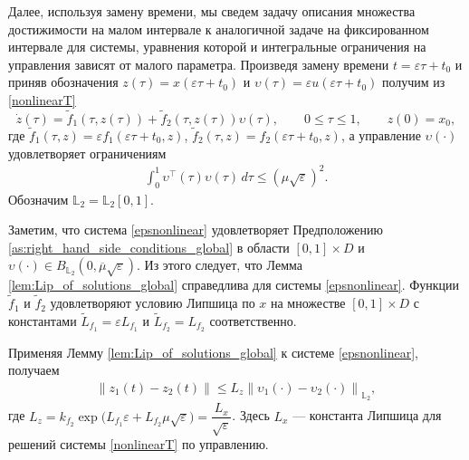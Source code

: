 \documentclass[../main.tex]{subfiles}
\begin{document}
	Далее, используя замену времени, мы сведем задачу описания множества достижимости на малом интервале к аналогичной задаче на фиксированном интервале для системы, уравнения которой и интегральные ограничения на управления зависят от малого параметра.
    Произведя замену времени
    $ t = \varepsilon \tau + t_0 $ и приняв обозначения $ z(\tau) = x(\varepsilon \tau + t_0) $ и $ \upsilon(\tau) = \varepsilon u(\varepsilon \tau + t_0) $  получим из \eqref{nonlinearT}
        \begin{equation}\label{epsnonlinear}
    	\dot{z}(\tau)=\widetilde{f}_1(\tau,z(\tau))+\widetilde{f}_2(\tau,z(\tau))\upsilon(\tau), \qquad 0 \leqslant \tau \leqslant 1, \qquad z(0) = x_0,
    \end{equation}
    где $ \widetilde{f}_1(\tau,z) = \varepsilon f_1(\varepsilon \tau + t_0,z) $, $ \widetilde{f}_2 (\tau,z) = f_2(\varepsilon \tau + t_0,z)$, а управление $ \upsilon(\cdot) $ удовлетворяет ограничениям
    \begin{gather}\label{epscond}
    	\int_0^1 \upsilon^{\top}(\tau) \upsilon(\tau) \, d\tau \leqslant \left( \mu \sqrt{\varepsilon}\right)^2.
    \end{gather}
    Обозначим $\mathbb{L}_2 = \mathbb{L}_2[0, 1]$. 
    
    Заметим, что система \eqref{epsnonlinear}  удовлетворяет Предположению  \ref{as:right_hand_side_conditions_global} в области $[0, 1]\times D$ и $\upsilon(\cdot) \in B_{\mathbb{L}_2}(0, \overline{\mu}\sqrt{\varepsilon}) $.  Из этого следует, что Лемма \ref{lem:Lip_of_solutions_global} справедлива для системы  \eqref{epsnonlinear}.  Функции  $\widetilde{f}_1$ и $\widetilde{f}_2$ удовлетворяют условию Липшица по $x$ на множестве $[0, 1]\times D$ с константами $\widetilde{L}_{f_1} = \varepsilon L_{f_1} $ и  $\widetilde{L}_{f_2} = L_{f_2} $ соответственно. 
    
    Применяя Лемму \ref{lem:Lip_of_solutions_global}   к системе \eqref{epsnonlinear}, получаем
    \begin{gather*}
    	\left\| z_1(t) - z_2(t) \right\| \leqslant L_z \left\|\upsilon_1(\cdot) - \upsilon_2(\cdot) \right\|_{\mathbb{L}_2},
    \end{gather*}
    где $ L_z = k_{f_2} \exp\Big( L_{f_1} \varepsilon + L_{f_2} \mu \sqrt{\varepsilon} \Big) = \dfrac{L_x}{\sqrt{\varepsilon}}$.
    Здесь $L_x$ --- константа Липшица для решений системы \eqref{nonlinearT} по управлению.
    
\end{document}

